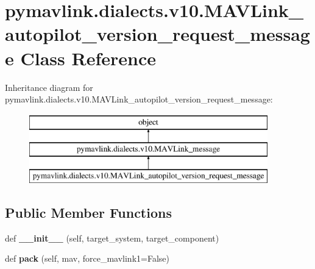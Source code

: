 \hypertarget{classpymavlink_1_1dialects_1_1v10_1_1MAVLink__autopilot__version__request__message}{}\section{pymavlink.\+dialects.\+v10.\+M\+A\+V\+Link\+\_\+autopilot\+\_\+version\+\_\+request\+\_\+message Class Reference}
\label{classpymavlink_1_1dialects_1_1v10_1_1MAVLink__autopilot__version__request__message}
Inheritance diagram for pymavlink.\+dialects.\+v10.\+M\+A\+V\+Link\+\_\+autopilot\+\_\+version\+\_\+request\+\_\+message\+:\begin{figure}[H]
\begin{center}
\leavevmode
\includegraphics[height=3.000000cm]{classpymavlink_1_1dialects_1_1v10_1_1MAVLink__autopilot__version__request__message}
\end{center}
\end{figure}
\subsection*{Public Member Functions}
\begin{DoxyCompactItemize}
\item 
\mbox{\label{classpymavlink_1_1dialects_1_1v10_1_1MAVLink__autopilot__version__request__message_a686f545fe700c9ed426b722c2044c648}} 
def {\bfseries \+\_\+\+\_\+init\+\_\+\+\_\+} (self, target\+\_\+system, target\+\_\+component)
\item 
\mbox{\label{classpymavlink_1_1dialects_1_1v10_1_1MAVLink__autopilot__version__request__message_a99001d7511dcc6dc6d8768d99dec8ffb}} 
def {\bfseries pack} (self, mav, force\+\_\+mavlink1=False)
\end{DoxyCompactItemize}
